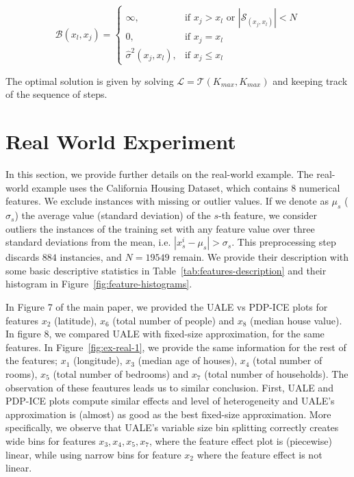 \documentclass[twoside]{article}
\begin{document}
\begin{equation}
  \label{eq:cost_step}
  \mathcal{B}(x_l, x_j) = \begin{cases}
                            \infty, & \text{if $x_j > x_l$ or \(|\mathcal{S}_{(x_j, x_l)}| < N\)}\\
                            0, & \text{if $x_j = x_l$}\\
                            \hat{\sigma}^2(x_j, x_l), &\text{if $x_j \leq x_l$}
  \end{cases}
\end{equation}

The optimal solution is given by solving
\(\mathcal{L} = \mathcal{T}(K_{max}, K_{max})\) and keeping track of the sequence of
steps.


\section{Real World Experiment}

In this section, we provide further details on the real-world
example. The real-world example uses the California Housing Dataset,
which contains 8 numerical features. We exclude instances with missing
or outlier values. If we denote as \(\mu_s\) (\(\sigma_s\)) the
average value (standard deviation) of the \(s\)-th feature, we
consider outliers the instances of the training set with any feature
value over three standard deviations from the mean, i.e.
\(|x_s^i - \mu_s| > \sigma_s\). This preprocessing step discards
\(884\) instancies, and \(N=19549\) remain. We provide their
description with some basic descriptive statistics in
Table~\ref{tab:features-description} and their histogram in
Figure~\ref{fig:feature-histograms}.

In Figure 7 of the main paper, we provided the UALE vs PDP-ICE plots
for features \(x_2\) (latitude), \(x_6\) (total number of people) and
\(x_8\) (median house value). In figure 8, we compared UALE with
fixed-size approximation, for the same features. In
Figure~\ref{fig:ex-real-1}, we provide the same information for the
rest of the features; \(x_1\) (longitude), \(x_3\) (median age of
houses), \(x_4\) (total number of rooms), \(x_5\) (total number of
bedrooms) and \(x_7\) (total number of households). The observation of
these feautures leads us to similar conclusion. First, UALE and
PDP-ICE plots compute similar effects and level of heterogeneity and
UALE's approximation is (almost) as good as the best fixed-size
approximation. More specifically, we observe that UALE's variable size
bin splitting correctly creates wide bins for features
\(x_3, x_4, x_5, x_7\), where the feature effect plot is (piecewise)
linear, while using narrow bins for feature \(x_2\) where the feature
effect is not linear.
\end{document}
